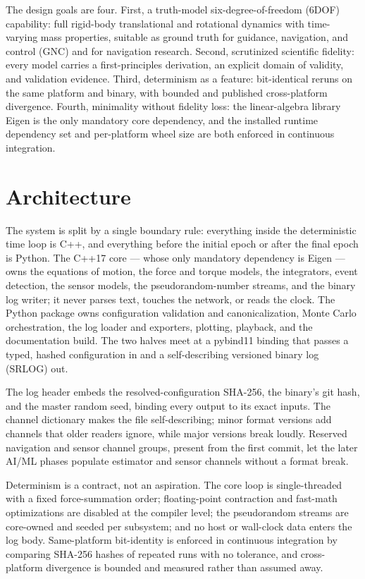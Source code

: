 \documentclass[10pt]{article}
\begin{document}
The design goals are four. First, a truth-model six-degree-of-freedom (6DOF)
capability: full rigid-body translational and rotational dynamics with
time-varying mass properties, suitable as ground truth for guidance,
navigation, and control (GNC) and for navigation research. Second, scrutinized
scientific fidelity: every model carries a first-principles derivation, an
explicit domain of validity, and validation evidence. Third, determinism as a
feature: bit-identical reruns on the same platform and binary, with bounded and
published cross-platform divergence. Fourth, minimality without fidelity loss:
the linear-algebra library Eigen is the only mandatory core dependency, and the
installed runtime dependency set and per-platform wheel size are both enforced
in continuous integration.

\section{Architecture}
\label{sec:architecture}

The system is split by a single boundary rule: everything inside the
deterministic time loop is C++, and everything before the initial epoch or
after the final epoch is Python. The C++17 core --- whose only mandatory
dependency is Eigen --- owns the equations of motion, the force and torque
models, the integrators, event detection, the sensor models, the
pseudorandom-number streams, and the binary log writer; it never parses text,
touches the network, or reads the clock. The Python package owns configuration
validation and canonicalization, Monte Carlo orchestration, the log loader and
exporters, plotting, playback, and the documentation build. The two halves meet
at a pybind11 binding that passes a typed, hashed configuration in and a
self-describing versioned binary log (SRLOG) out.

The log header embeds the resolved-configuration SHA-256, the binary's git
hash, and the master random seed, binding every output to its exact inputs. The
channel dictionary makes the file self-describing; minor format versions add
channels that older readers ignore, while major versions break loudly.
Reserved navigation and sensor channel groups, present from the first commit,
let the later AI/ML phases populate estimator and sensor channels without a
format break.

Determinism is a contract, not an aspiration. The core loop is single-threaded
with a fixed force-summation order; floating-point contraction and fast-math
optimizations are disabled at the compiler level; the pseudorandom streams are
core-owned and seeded per subsystem; and no host or wall-clock data enters the
log body. Same-platform bit-identity is enforced in continuous integration by
comparing SHA-256 hashes of repeated runs with no tolerance, and cross-platform
divergence is bounded and measured rather than assumed away.
\end{document}
